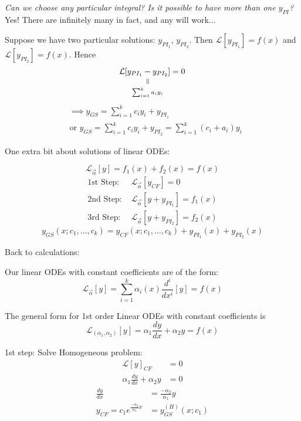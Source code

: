 \documentclass[10pt]{scrartcl}
\begin{document}
\emph{Can we choose any particular integral? Is it possible to have more than one $y_{PI}$?} Yes! There are infinitely many in fact, and any will work...


Suppose we have two particular solutions: $y_{PI_1}$, $y_{PI_2}$. Then  $\mathcal{L}[y_{PI_1}] = f(x)$ and $ \mathcal{L}[y_{PI_2}] = f(x)$. Hence
\[
  \mathcal{L}\equalto{[y_{PI_1} - y_{PI_2}]}{\sum_{i=1}^ka_iy_i} = 0
\]
\[
\begin{aligned}
  &\implies y_{GS} = \sum_{i=1}^kc_iy_i + y_{PI_1}\\
  &\text{or }y_{GS} = \sum_{i=1}^kc_iy_i + y_{PI_2} = \sum_{i=1}^k(c_i+a_i)y_i
\end{aligned}
\]

One extra bit about solutions of linear ODEs:

\[\mathcal{L}_{\vec{\alpha}}[y] = f_1(x) + f_2(x) = f(x)\]
\[
\begin{aligned}
  \mbox{1st Step: }& \mathcal{L}_{\vec{\alpha}}[y_{CF}] = 0\\
  \mbox{2nd Step: }& \mathcal{L}_{\vec{\alpha}}[y+{y_{PI_1}}] = f_1(x)\\
  \mbox{3rd Step: }& \mathcal{L}_{\vec{\alpha}}[y+{y_{PI_2}}] = f_2(x)
\end{aligned}
\]
\[y_{GS}(x;c_1,\dots,c_k) = y_{CF}(x;c_1,\dots,c_k) + y_{PI_1}(x) + y_{PI_2}(x)\]

Back to calculations: 

Our linear ODEs with constant coefficients are of the form:
\[\mathcal{L}_{\vec{\alpha}}[y] = \sum_{i=1}^k\alpha_i(x)\frac{d^i}{dx^i}[y] = f(x)\]\vspace*{5pt}

The general form for 1st order Linear ODEs with constant coefficients is
\[\mathcal{L}_{(\alpha_1,\alpha_2)}[y] = \alpha_1\frac{dy}{dx} + \alpha_2y = f(x)\]

1st step: Solve Homogeneous problem:
\[
\begin{aligned}
  \mathcal{L}[y]_{CF} &= 0\\
  \alpha_1\frac{dy}{dx} + \alpha_2y &= 0
  \end{aligned}\]
\[\begin{aligned}
  \frac{dy}{dx} &= \frac{-\alpha_2}{\alpha_1}y\\
  y_{CF} = c_1e^{\frac{-\alpha_2}{\alpha_1}x} &= y_{GS}^{(H)}(x;c_1)
\end{aligned}
\]
\end{document}
